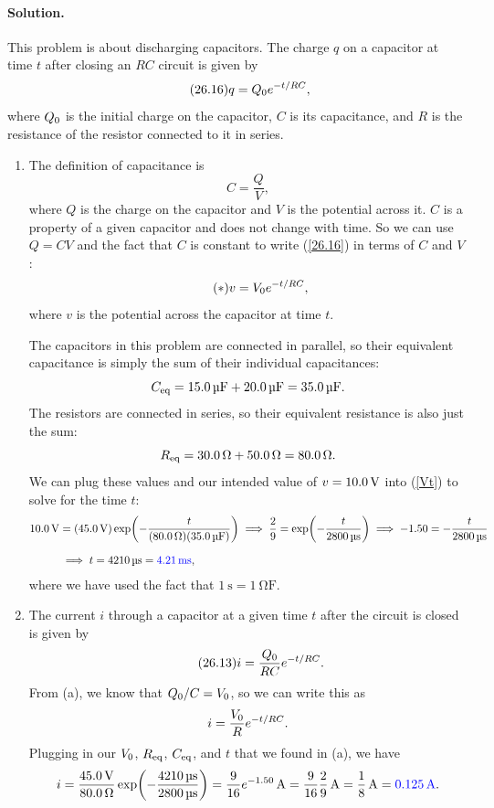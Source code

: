 \documentclass[11pt]{article}
\newcommand{\refeq}[1]{(\ref{#1})}
\newcommand{\beq}{\begin{equation*}}
\newcommand{\eeq}{\end{equation*}}
\newcommand{\beqn}{\begin{equation}}
\newcommand{\eeqn}{\end{equation}}
\newenvironment{solution}
{
    \paragraph{Solution.}
    \ignorespaces
}
{
    \bigskip
}
\begin{document}
\begin{solution}
	This problem is about discharging capacitors.  The charge $q$ on a capacitor at time $t$ after closing an $RC$ circuit is given by
	\beqn \label{26.16} \tag{26.16}
		q = \Qo e^{-t / RC},
	\eeqn
	where $Q_0$ is the initial charge on the capacitor, $C$ is its capacitance, and $R$ is the resistance of the resistor connected to it in series.
	
	\begin{enumerate}
		\item The definition of capacitance is
		\beq
			C = \frac{Q}{V},
		\eeq
		where $Q$ is the charge on the capacitor and $V$ is the potential across it.  $C$ is a property of a given capacitor and does not change with time.  So we can use $Q = C V$ and the fact that $C$ is constant to write \refeq{26.16} in terms of $C$ and $V$:
		\beqn \tag{$*$} \label{Vt}
			v = \Vo e^{-t / RC},
		\eeqn
		where $v$ is the potential across the capacitor at time $t$.
		
		The capacitors in this problem are connected in parallel, so their equivalent capacitance is simply the sum of their individual capacitances:
		\beq
			\Ceq = \SI{15.0}{\micro\farad} + \SI{20.0}{\micro\farad}
			= \SI{35.0}{\micro\farad}.
		\eeq
		The resistors are connected in series, so their equivalent resistance is also just the sum:
		\beq
			\Req = \SI{30.0}{\ohm} + \SI{50.0}{\ohm}
			= \SI{80.0}{\ohm}.
		\eeq
		We can plug these values and our intended value of $v = \SI{10.0}{\volt}$ into \refeq{Vt} to solve for the time $t$:
		\begin{align*}
			\SI{10.0}{\volt} &= (\SI{45.0}{\volt}) \exp(-\frac{t}{(\SI{80.0}{\ohm}) (\SI{35.0}{\micro\farad})})
			\implies
			\frac{2}{9} = \exp(-\frac{t}{\SI{2800}{\micro\second}})
			\implies
			-1.50 = -\frac{t}{\SI{2800}{\micro\second}} \\[1.5ex]
			&\implies
			t = \SI{4210}{\micro\second}
			= {\color{blue} \SI{4.21}{\milli\second}},
		\end{align*}
		where we have used the fact that $\SI{1}{\second} = \SI{1}{\ohm\farad}$.
		
		\item The current $i$ through a capacitor at a given time $t$ after the circuit is closed is given by
		\beq \tag{26.13}
			i = \frac{\Qo}{RC} e^{-t / RC}.
		\eeq
		From (a), we know that $Q_0 / C = V_0$, so we can write this as
		\beq
			i = \frac{\Vo}{R} e^{-t / RC}.
		\eeq
		Plugging in our $V_0$, $R_\text{eq}$, $C_\text{eq}$, and $t$ that we found in (a), we have
		\beq
			i = \frac{\Svolt{45.0}}{\SI{80.0}{\ohm}} \exp(-\frac{\SI{4210}{\micro\second}}{\SI{2800}{\micro\second}})
			= \frac{9}{16} e^{-1.50}\,\si{\ampere}
			= \frac{9}{16} \frac{2}{9}\,\si{\ampere}
			= \frac{1}{8}\,\si{\ampere}
			= {\color{blue} \SI{0.125}{\ampere}}.
		\eeq
	\end{enumerate}
\end{solution}
\end{document}
